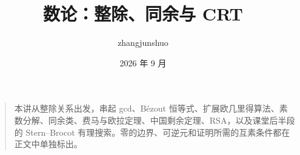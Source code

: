 \documentclass[UTF8,a4paper,11pt]{ctexart}
\begin{document}
\title{数论：整除、同余与 CRT}
\author{zhangjunshuo}
\date{2026 年 9 月}
\maketitle
\begin{quote}
本讲从整除关系出发，串起 gcd、Bézout 恒等式、扩展欧几里得算法、素数分解、同余类、费马与欧拉定理、中国剩余定理、RSA，以及课堂后半段的 Stern--Brocot 有理搜索。零的边界、可逆元和证明所需的互素条件都在正文中单独标出。
\end{quote}

\clearpage
{\small\tableofcontents}

\clearpage









\end{document}
